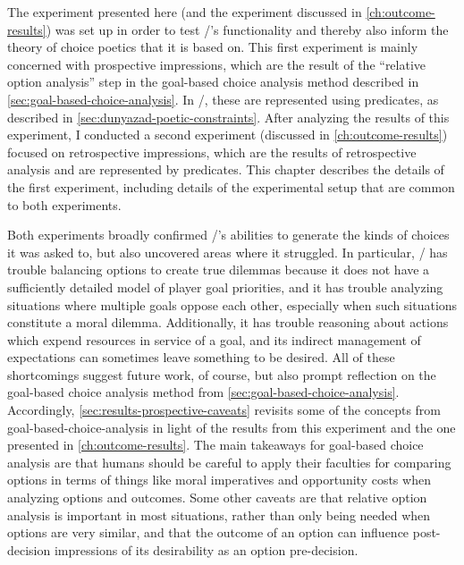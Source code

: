 The experiment presented here (and the experiment discussed in \cref{ch:outcome-results}) was set up in order to test \dunyazad/'s functionality and thereby also inform the theory of choice poetics that it is based on.
%
This first experiment is mainly concerned with prospective impressions, which are the result of the ``relative option analysis'' step in the goal-based choice analysis method described in \cref{sec:goal-based-choice-analysis}.
%
In \dunyazad/, these are represented using  predicates, as described in \cref{sec:dunyazad-poetic-constraints}.
%
After analyzing the results of this experiment, I conducted a second experiment (discussed in \cref{ch:outcome-results}) focused on retrospective impressions, which are the results of retrospective analysis and are represented by  predicates.
%
This chapter describes the details of the first experiment, including details of the experimental setup that are common to both experiments.


Both experiments broadly confirmed \dunyazad/'s abilities to generate the kinds of choices it was asked to, but also uncovered areas where it struggled.
%
In particular, \dunyazad/ has trouble balancing options to create true dilemmas because it does not have a sufficiently detailed model of player goal priorities, and it has trouble analyzing situations where multiple goals oppose each other, especially when such situations constitute a moral dilemma.
%
Additionally, it has trouble reasoning about actions which expend resources in service of a goal, and its indirect management of expectations can sometimes leave something to be desired.
%
All of these shortcomings suggest future work, of course, but also prompt reflection on the goal-based choice analysis method from \cref{sec:goal-based-choice-analysis}.
%
Accordingly, \cref{sec:results-prospective-caveats} revisits some of the concepts from goal-based-choice-analysis in light of the results from this experiment and the one presented in \cref{ch:outcome-results}.
%
The main takeaways for goal-based choice analysis are that humans should be careful to apply their faculties for comparing options in terms of things like moral imperatives and opportunity costs when analyzing options and outcomes.
%
Some other caveats are that relative option analysis is important in most situations, rather than only being needed when options are very similar, and that the outcome of an option can influence post-decision impressions of its desirability as an option pre-decision.

